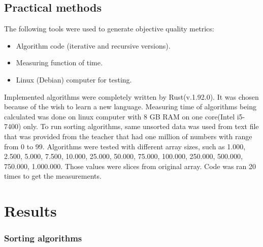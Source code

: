 \documentclass{article}
\begin{document}
\subsection{Practical methods}
The following tools were used to generate objective quality metrics:
\begin{itemize}
    \item Algorithm code (iterative and recursive versions).
    \item Measuring function of time.
    \item Linux (Debian) computer for testing.
\end{itemize}
Implemented algorithms were completely written by Rust(v.1.92.0). It was chosen because of the wish to learn a new language. Measuring time of algorithms being calculated was done on linux computer with 8 GB RAM on one core(Intel i5-7400) only.
To run sorting algorithms, same unsorted data was used from text file that was provided from the teacher that had one million of numbers with range from 0 to 99. Algorithms were tested with different array sizes, such as 1.000, 2.500, 5.000, 7.500, 10.000,  25.000, 50.000, 75.000, 100.000, 250.000, 500.000, 750.000,  1.000.000. Those values were slices from original array. Code was ran 20 times to get the measurements. 

\section{Results}

\subsubsection{Sorting algorithms}
\end{document}
